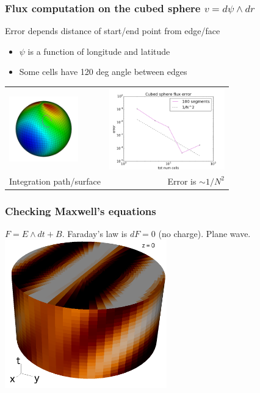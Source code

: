 \documentclass[aspectratio=169]{beamer}
\begin{document}
\begin{frame}[t]
  \frametitle{Flux computation on the cubed sphere $v = d\psi \wedge dr$}
  \begin{block}{Error depends distance of start/end point from edge/face}
   \begin{itemize}
   \item $\psi$ is a function of longitude and latitude
   \item Some cells have 120 deg angle between edges
   \end{itemize}
  \end{block}
  
  \begin{tabular}{lr}
  \includegraphics[width=30mm]{fluxOnCubedSphere.png} & 
  \includegraphics[width=50mm]{cubedSphereFluxError.png} \\
  {Integration path/surface} & {Error is $\sim 1/N^2$} 
  \end{tabular}
\end{frame}

\begin{frame}[t]
  \frametitle{Checking Maxwell's equations}
  \begin{block}{$F = E\wedge dt + B$. Faraday's law is $d F = 0$ (no charge). Plane wave.}
  \includegraphics[width=70mm]{z0_0.png}
  \end{block}
\end{frame}
\end{document}
